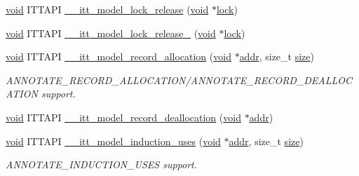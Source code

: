 \begin{DoxyCompactItemize}
\item 
\hyperlink{ittnotify__static_8h_af941d56e55e3c5465135b60c4d6343ed}{void} I\-T\-T\-A\-P\-I \hyperlink{group__model_ga57b59ce957b207bd68bbe1a40ff43e72}{\-\_\-\-\_\-itt\-\_\-model\-\_\-lock\-\_\-release} (\hyperlink{ittnotify__static_8h_af941d56e55e3c5465135b60c4d6343ed}{void} $\ast$\hyperlink{ittnotify__static_8h_ac33a428b292b874e62e0f98c2326b2c7}{lock})
\item 
\hyperlink{ittnotify__static_8h_af941d56e55e3c5465135b60c4d6343ed}{void} I\-T\-T\-A\-P\-I \hyperlink{group__model_gaa3c9a6278f8e680ba60394dae6f2c725}{\-\_\-\-\_\-itt\-\_\-model\-\_\-lock\-\_\-release\-\_} (\hyperlink{ittnotify__static_8h_af941d56e55e3c5465135b60c4d6343ed}{void} $\ast$\hyperlink{ittnotify__static_8h_ac33a428b292b874e62e0f98c2326b2c7}{lock})
\item 
\hyperlink{ittnotify__static_8h_af941d56e55e3c5465135b60c4d6343ed}{void} I\-T\-T\-A\-P\-I \hyperlink{group__model_gae05bef073667cfa3d5713103a5256e27}{\-\_\-\-\_\-itt\-\_\-model\-\_\-record\-\_\-allocation} (\hyperlink{ittnotify__static_8h_af941d56e55e3c5465135b60c4d6343ed}{void} $\ast$\hyperlink{ittnotify__static_8h_a7e21c61c16fffcc27199a9d66ff39ab8}{addr}, size\-\_\-t \hyperlink{ittnotify__static_8h_a5a1daa0c1d342747e3884fa54fc64fb1}{size})
\begin{DoxyCompactList}\small\item\em A\-N\-N\-O\-T\-A\-T\-E\-\_\-\-R\-E\-C\-O\-R\-D\-\_\-\-A\-L\-L\-O\-C\-A\-T\-I\-O\-N/\-A\-N\-N\-O\-T\-A\-T\-E\-\_\-\-R\-E\-C\-O\-R\-D\-\_\-\-D\-E\-A\-L\-L\-O\-C\-A\-T\-I\-O\-N support. \end{DoxyCompactList}\item 
\hyperlink{ittnotify__static_8h_af941d56e55e3c5465135b60c4d6343ed}{void} I\-T\-T\-A\-P\-I \hyperlink{group__model_ga02ec434226d34bd3776173025af69283}{\-\_\-\-\_\-itt\-\_\-model\-\_\-record\-\_\-deallocation} (\hyperlink{ittnotify__static_8h_af941d56e55e3c5465135b60c4d6343ed}{void} $\ast$\hyperlink{ittnotify__static_8h_a7e21c61c16fffcc27199a9d66ff39ab8}{addr})
\item 
\hyperlink{ittnotify__static_8h_af941d56e55e3c5465135b60c4d6343ed}{void} I\-T\-T\-A\-P\-I \hyperlink{group__model_gaf8d22f3fc7e8c30ff185735852ff728f}{\-\_\-\-\_\-itt\-\_\-model\-\_\-induction\-\_\-uses} (\hyperlink{ittnotify__static_8h_af941d56e55e3c5465135b60c4d6343ed}{void} $\ast$\hyperlink{ittnotify__static_8h_a7e21c61c16fffcc27199a9d66ff39ab8}{addr}, size\-\_\-t \hyperlink{ittnotify__static_8h_a5a1daa0c1d342747e3884fa54fc64fb1}{size})
\begin{DoxyCompactList}\small\item\em A\-N\-N\-O\-T\-A\-T\-E\-\_\-\-I\-N\-D\-U\-C\-T\-I\-O\-N\-\_\-\-U\-S\-E\-S support. \end{DoxyCompactList}\item 

\end{DoxyCompactItemize}
